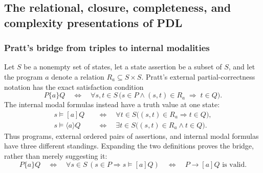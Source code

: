 
\subsection{The relational, closure, completeness, and complexity presentations of PDL}
\label{sec:p09-presentation-n-c-021}

\subsubsection{Pratt's bridge from triples to internal modalities}

Let \(S\) be a nonempty set of states, let a state assertion be a subset of
\(S\), and let the program \(a\) denote a relation \(R_a\subseteq S\times S\).
Pratt's external partial-correctness notation has the exact satisfaction
condition
\[
 P\{a\}Q
 \quad\Longleftrightarrow\quad
 \forall s,t\in S\,
   \bigl(s\in P\land (s,t)\in R_a\;\Longrightarrow\;t\in Q\bigr).
\]
The internal modal formulas instead have a truth value at one state:
\[
\begin{aligned}
 s\models[a]Q
   &\quad\Longleftrightarrow\quad
   \forall t\in S\bigl((s,t)\in R_a\Longrightarrow t\in Q\bigr),\\
 s\models\langle a\rangle Q
   &\quad\Longleftrightarrow\quad
   \exists t\in S\bigl((s,t)\in R_a\land t\in Q\bigr).
\end{aligned}
\]
Thus programs, external ordered pairs of assertions, and internal modal
formulas have three different standings.  Expanding the two definitions proves
the bridge, rather than merely suggesting it:
\[
 P\{a\}Q
 \quad\Longleftrightarrow\quad
 \forall s\in S\,(s\in P\Longrightarrow s\models[a]Q)
 \quad\Longleftrightarrow\quad
 P\to[a]Q\text{ is valid}.
\]

